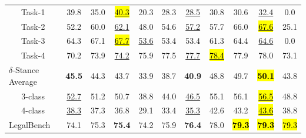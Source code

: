 \begin{table}[ht]
\begin{threeparttable}
\begin{tabular}{cccc|ccc|ccc|c}
    Task-1\tnote{$\bigstar$} & 39.8 & 35.0 & \underline{\hl{40.3}} & 20.3 & 28.3 & \underline{28.5} & 30.8 & 30.6 & \underline{32.4} & 0.0 \\
    Task-2\tnote{$\bigstar$$\Diamond$} & 52.2 & 60.0 & \underline{62.1} & 48.0 & 54.6 & \underline{57.2} & 57.7 & 66.0 & \underline{\hl{67.6}} & 25.1 \\
    Task-3\tnote{$\triangle$} & 64.3 & 67.1 & \underline{\hl{67.7}} & \underline{53.6} & 53.4 & 53.4 & 61.3 & 64.4 & \underline{64.6} & 0.0 \\
    Task-4\tnote{$\S$$\Diamond$} & 70.2 & 73.9 & \underline{74.2} & 75.9 & 77.5 & \underline{77.7} & \underline{\hl{78.4}} & 77.9 & 78.0 & 73.1 \\
   \hline
   \multicolumn{1}{l}{$\delta$-Stance Average\tnote{$\dag$$\Diamond$}} & \textbf{45.5} & 44.3 & 43.7 & 33.9 & 38.7 & \textbf{40.9} & 48.8 & 49.7 & \hl{\textbf{50.1}} & 43.8 \\
   3-class & \underline{52.7} & 51.2 & 50.7 & 38.8 & 44.0 & \underline{46.5} & 55.1 & 56.1 & \underline{\hl{56.5}} & 48.8 \\
   4-class & \underline{38.3} & 37.3 & 36.8 & 29.1 & 33.4 & \underline{35.3} & 42.6 & 43.2 & \underline{\hl{43.6}} & 38.8 \\
   \hline
   \multicolumn{1}{l}{LegalBench\tnote{$\blacktriangle$}} & 74.1 & 75.3 & \textbf{75.4} & 74.2 & 75.9 & \textbf{76.4} & 78.0 & \hl{\textbf{79.3}} & \hl{\textbf{79.3}} & \hl{79.3} \\

\end{tabular}
\end{threeparttable}
\end{table}
